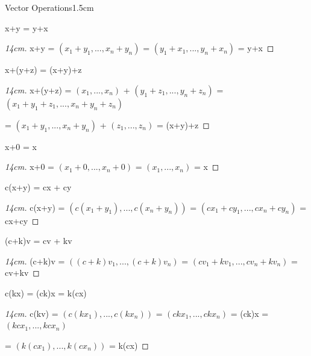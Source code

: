     \begin{ltheorem}{Vector Operations}{1.5cm}
        \item x+y = y+x
        
            \begin{proof}[14cm]
                x+y
                = $(x_1+y_1,...,x_n+y_n)$
                = $(y_1+x_1,...,y_n+x_n)$
                = y+x  
            \end{proof}

        \item x+(y+z) = (x+y)+z
            
            \begin{proof}[14cm]
                x+(y+z)
                = $(x_1,...,x_n)$ + $(y_1+z_1,...,y_n+z_n)$
                = $(x_1+y_1+z_1,...,x_n+y_n+z_n)$
                
                \hspace{1.6cm}
                = $(x_1+y_1,...,x_n+y_n)$ + $(z_1,...,z_n)$
                = (x+y)+z
            \end{proof}

            \newpage

        \item x+0 = x
            
            \begin{proof}[14cm]
                x+0
                = $(x_1+0,...,x_n+0)$
                = $(x_1,...,x_n)$
                = x
            \end{proof}

        \item c(x+y) = cx + cy
            
            \begin{proof}[14cm]
                c(x+y)
                = $(c(x_1+y_1),...,c(x_n+y_n))$
                = $(cx_1+cy_1,...,cx_n+cy_n)$
                = cx+cy
            \end{proof}

        \item (c+k)v = cv + kv
            
            \begin{proof}[14cm]
                (c+k)v
                = $((c+k)v_1,...,(c+k)v_n)$
                = $(cv_1+kv_1,...,cv_n+kv_n)$
                = cv+kv
            \end{proof}

        \item c(kx) = (ck)x = k(cx)
            
            \begin{proof}[14cm]
                c(kv)
                = $(c(kx_1),...,c(kx_n))$
                = $(ckx_1,...,ckx_n)$
                = (ck)x
                = $(kcx_1,...,kcx_n)$
                
                \hspace{1cm}
                = $(k(cx_1),...,k(cx_n))$
                = k(cx)
            \end{proof}
    \end{ltheorem}

